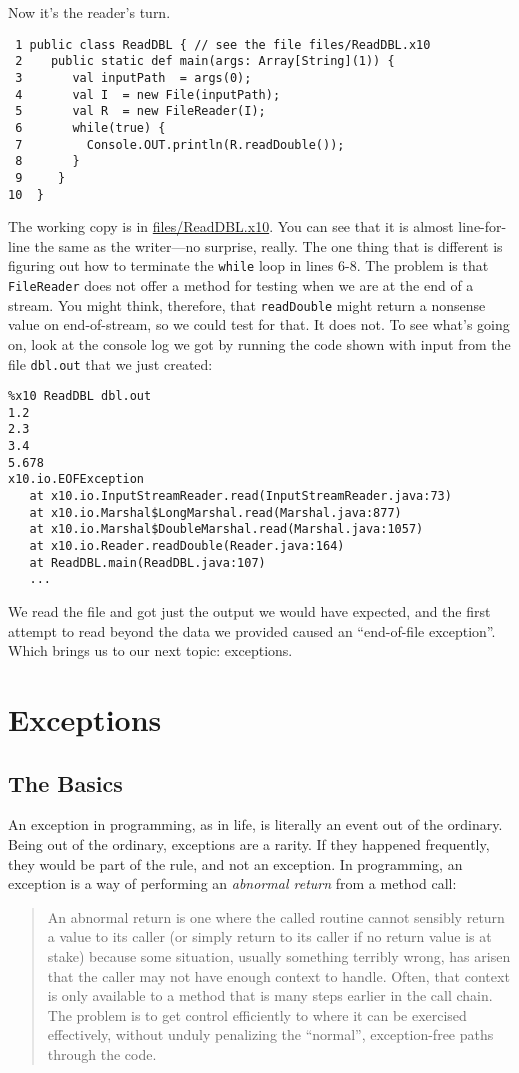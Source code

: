 Now it's the reader's turn.  
\begin{verbatim}
 1 public class ReadDBL { // see the file files/ReadDBL.x10
 2    public static def main(args: Array[String](1)) {
 3       val inputPath  = args(0);
 4       val I  = new File(inputPath);
 5       val R  = new FileReader(I);
 6       while(true) {
 7         Console.OUT.println(R.readDouble());
 8       }
 9     } 
10  }
\end{verbatim}
The working copy is in
\href{http://dist.codehaus.org/x10/documentation/guide/src/files/ReadDBL.x10}{files/ReadDBL.x10}.
You can see that it is almost line-for-line the same
as the writer---no surprise, really.  The one thing that is different is
figuring out how to terminate the {\tt while} loop in lines 6-8.  The problem is
that {\tt FileReader} does not offer a method for testing when we are at the end
of a stream.  You might think, therefore, that {\tt readDouble} might return a
nonsense value on end-of-stream, so we could test for that.  It does not.  To
see what's going on, look at the console log we got by running the code shown
with input from the file {\tt dbl.out} that we just created:
\begin{verbatim}
%x10 ReadDBL dbl.out
1.2
2.3
3.4
5.678
x10.io.EOFException
   at x10.io.InputStreamReader.read(InputStreamReader.java:73)
   at x10.io.Marshal$LongMarshal.read(Marshal.java:877)
   at x10.io.Marshal$DoubleMarshal.read(Marshal.java:1057)
   at x10.io.Reader.readDouble(Reader.java:164)
   at ReadDBL.main(ReadDBL.java:107)
   ...
\end{verbatim}
We read the file and got just the output we would have expected, and the first
attempt to read beyond the data we provided caused an ``end-of-file exception''.
Which brings us to our next topic: exceptions.
\section{Exceptions}\label{sec:exc}
\subsection{The Basics}
An exception in programming, as in life, is literally an event out of the
ordinary.  Being out of the ordinary, exceptions are a rarity. If they
happened frequently, they would be part of the rule, and not an exception.
In programming, an exception is a way of performing an {\em abnormal return}
from a method call: 
\begin{quote}
An abnormal return is one where the called routine cannot sensibly return a
value to its caller (or simply return to its caller if no return value is at
stake) because some situation, usually something terribly wrong, has arisen
that the caller may not have enough context to handle.  Often, that context is
only available to a method that is many steps earlier in the call chain.  The
problem is to get control efficiently to where it can be exercised effectively,
without unduly penalizing the ``normal'', exception-free paths through the code.
\end{quote}

